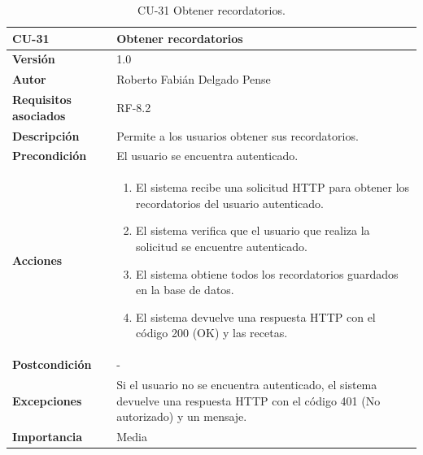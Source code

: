 \begin{table}[p]
	\centering
	\begin{tabularx}{\linewidth}{ p{} p{} }
		\toprule
		\textbf{CU-31}    & \textbf{Obtener recordatorios}\\
		\toprule
		\textbf{Versión}              & 1.0    \\
		\textbf{Autor}                & Roberto Fabián Delgado Pense \\
		\textbf{Requisitos asociados} & RF-8.2 \\ 
		\textbf{Descripción}          & Permite a los usuarios obtener sus recordatorios. \\
		\textbf{Precondición}         & El usuario se encuentra autenticado. \\  
		\textbf{Acciones}             &
		\begin{enumerate}
			\def\labelenumi{\arabic{enumi}.}
			\tightlist
			\item El sistema recibe una solicitud HTTP para obtener los recordatorios del usuario autenticado.
                \item El sistema verifica que el usuario que realiza la solicitud se encuentre autenticado.
			\item El sistema obtiene todos los recordatorios guardados en la base de datos.
                \item El sistema devuelve una respuesta HTTP con el código 200 (OK) y las recetas.         
            \end{enumerate}\\
		\textbf{Postcondición}        & -  \\
		\textbf{Excepciones}          &  Si el usuario no se encuentra autenticado, el 
                    sistema devuelve una respuesta HTTP con el código 401 (No autorizado) y un mensaje.\\
		\textbf{Importancia}          & Media \\
		\bottomrule
	\end{tabularx}
	\caption{CU-31 Obtener recordatorios.}
\end{table}

